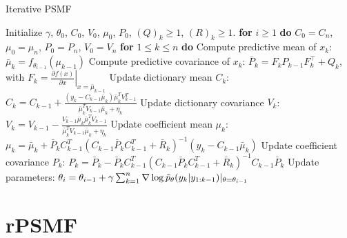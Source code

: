\documentclass{mldsmsc}
\begin{document}
\begin{algorithm}[H]
\caption{Iterative PSMF}
\begin{algorithmic}[1]
\State Initialize $\gamma$, $\theta_0$, $C_0$, $V_0$, $\mu_0$, $P_0$, $(Q)_k{\geq1}$, $(R)_k{\geq1}$.
\State \textbf{for} $i \geq 1$ \textbf{do}
\State \hspace{1em} $C_0 = C_n$, $\mu_0 = \mu_n$, $P_0 = P_n$, $V_0 = V_n$
\State \hspace{1em} \textbf{for} $1 \leq k \leq n$ \textbf{do}
\State \hspace{2em} Compute predictive mean of $x_k$:
\State \hspace{3em} $\bar{\mu}_k = f_{\theta_{i-1}}(\mu_{k-1})$
\State \hspace{2em} Compute predictive covariance of $x_k$:
\State \hspace{3em} $\bar{P}_k = F_k P_{k-1} F_k^\top + Q_k$, with $F_k = \left. \frac{\partial f(x)}{\partial x} \right|_{x=\bar{\mu}_{k-1}}$
\State \hspace{2em} Update dictionary mean $C_k$:
\State \hspace{3em} $C_k = C_{k-1} + \frac{(y_k - C_{k-1} \bar{\mu}_k) \bar{\mu}_k^T V_{k-1}^T}{\bar{\mu}_k^T V_{k-1} \bar{\mu}_k + \eta_k}$
\State \hspace{2em} Update dictionary covariance $V_k$:
\State \hspace{3em} $V_k = V_{k-1} - \frac{V_{k-1} \bar{\mu}_k \bar{\mu}_k^T V_{k-1}}{\bar{\mu}_k^T V_{k-1} \bar{\mu}_k + \eta_k}$
\State \hspace{2em} Update coefficient mean $\mu_k$:
\State \hspace{3em} $\mu_k = \bar{\mu}_k + \bar{P}_k C_{k-1}^T (C_{k-1} \bar{P}_k C_{k-1}^T + \bar{R}_k)^{-1} (y_k - C_{k-1} \bar{\mu}_k)$
\State \hspace{2em} Update coefficient covariance $P_k$:
\State \hspace{3em} $P_k = \bar{P}_k - \bar{P}_k C_{k-1}^T (C_{k-1} \bar{P}_k C_{k-1}^T + \bar{R}_k)^{-1} C_{k-1} \bar{P}_k$
\State \hspace{1em} Update parameters:
\State \hspace{2em} $\theta_i = \theta_{i-1} + \gamma \sum_{k=1}^n \nabla \log \Tilde{p}_{\theta}(y_k | y_{1:k-1}) \vert_{\theta = \theta_{i-1}}$
\end{algorithmic}\label{algo:1}
\end{algorithm}

\section{rPSMF}
\end{document}
